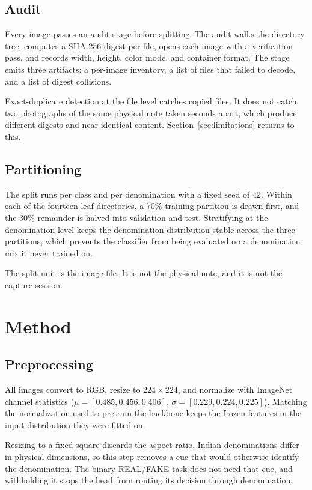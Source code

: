 \documentclass[conference]{IEEEtran}
\begin{document}
\subsection{Audit}

Every image passes an audit stage before splitting. The audit walks the
directory tree, computes a SHA-256 digest per file, opens each image with a
verification pass, and records width, height, color mode, and container format.
The stage emits three artifacts: a per-image inventory, a list of files that
failed to decode, and a list of digest collisions.

Exact-duplicate detection at the file level catches copied files. It does not
catch two photographs of the same physical note taken seconds apart, which
produce different digests and near-identical content.
Section~\ref{sec:limitations} returns to this.

\subsection{Partitioning}

The split runs per class and per denomination with a fixed seed of 42. Within
each of the fourteen leaf directories, a 70\% training partition is drawn first,
and the 30\% remainder is halved into validation and test. Stratifying at the
denomination level keeps the denomination distribution stable across the three
partitions, which prevents the classifier from being evaluated on a denomination
mix it never trained on.

The split unit is the image file. It is not the physical note, and it is not the
capture session.

\section{Method}

\subsection{Preprocessing}

All images convert to RGB, resize to $224 \times 224$, and normalize with
ImageNet channel statistics ($\mu = [0.485, 0.456, 0.406]$,
$\sigma = [0.229, 0.224, 0.225]$). Matching the normalization used to pretrain
the backbone keeps the frozen features in the input distribution they were
fitted on.

Resizing to a fixed square discards the aspect ratio. Indian denominations
differ in physical dimensions, so this step removes a cue that would otherwise
identify the denomination. The binary REAL/FAKE task does not need that cue, and
withholding it stops the head from routing its decision through denomination.
\end{document}
